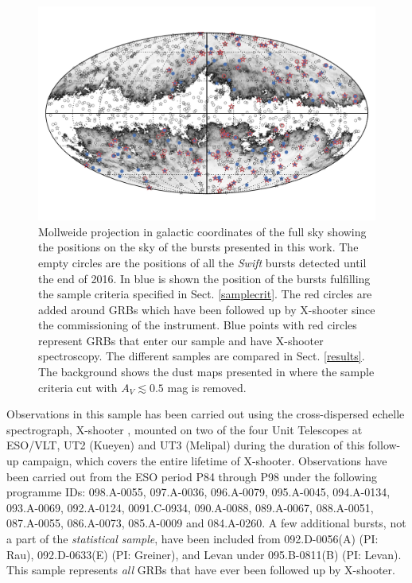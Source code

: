 \documentclass{aa}    %
\begin{document}
\begin{figure}
	\centerline{\includegraphics{figures/skymap.pdf}}
	\caption{Mollweide projection in galactic coordinates of the full sky showing
		the positions on the sky of the bursts presented in this work. The empty
		circles are the positions of all the \textit{Swift} bursts detected until the
		end of 2016. In blue is shown the position of the bursts fulfilling the sample
		criteria specified in Sect. \ref{samplecrit}. The red circles are added around
		GRBs which have been followed up by X-shooter since the commissioning of the
		instrument. Blue points with red circles represent GRBs that enter our sample
		and have X-shooter spectroscopy. The different samples are compared in Sect.
		\ref{results}. The background shows the dust maps presented in
		\citet{Schlegel1998} where the sample criteria cut with $A_V \lesssim 0.5$ mag
		is removed.}
	\label{fig:skymap}
\end{figure}



Observations in this sample has been carried out using the cross-dispersed
echelle spectrograph, X-shooter \citep{Vernet2011}, mounted on two of the four
Unit Telescopes at ESO/VLT, UT2 (Kueyen) and UT3 (Melipal) during the duration
of this follow-up campaign, which covers the entire lifetime of X-shooter.
Observations have been carried out from the ESO period P84 through P98 under the
following programme IDs: 098.A-0055, 097.A-0036, 096.A-0079, 095.A-0045,
094.A-0134, 093.A-0069, 092.A-0124, 0091.C-0934, 090.A-0088, 089.A-0067,
088.A-0051, 087.A-0055, 086.A-0073, 085.A-0009 and 084.A-0260. A few additional
bursts, not a part of the \textit{statistical sample}, have been included from
092.D-0056(A) (PI: Rau), 092.D-0633(E) (PI: Greiner), and Levan under
095.B-0811(B) (PI: Levan). This sample represents \textit{all} GRBs that have
ever been followed up by X-shooter.
\end{document}
